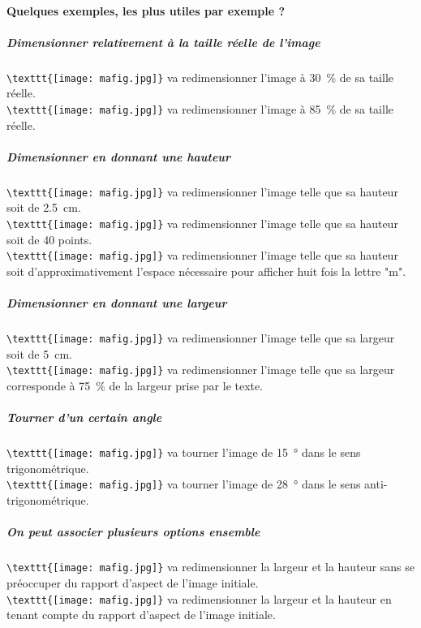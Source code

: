 \documentclass[a4paper, 13pt]{report} %
\begin{document}
		\paragraph{Quelques exemples, les plus utiles par exemple ?}
			\subparagraph{Dimensionner relativement à la taille réelle de l'image\\}
				\verb|\texttt{[image: mafig.jpg]}| va redimensionner l'image à \SI{30}{\percent} de sa taille réelle.\\
				\verb|\texttt{[image: mafig.jpg]}| va redimensionner l'image à \SI{85}{\percent} de sa taille réelle.
			\subparagraph{Dimensionner en donnant une hauteur\\}
				\verb|\texttt{[image: mafig.jpg]}| va redimensionner l'image telle que sa hauteur soit de \SI{2.5}{\centi\meter}.\\
				\verb|\texttt{[image: mafig.jpg]}| va redimensionner l'image telle que sa hauteur soit de 40 points.\\
				\verb|\texttt{[image: mafig.jpg]}| va redimensionner l'image telle que sa hauteur soit d'approximativement l'espace nécessaire pour afficher huit fois la lettre "m".
			\subparagraph{Dimensionner en donnant une largeur\\}
				\verb|\texttt{[image: mafig.jpg]}| va redimensionner l'image telle que sa largeur soit de \SI{5}{\centi\meter}.\\
				\verb|\texttt{[image: mafig.jpg]}| va redimensionner l'image telle que sa largeur corresponde à \SI{75}{\percent} de la largeur prise par le texte.
			\subparagraph{Tourner d'un certain angle\\}
				\verb|\texttt{[image: mafig.jpg]}| va tourner l'image de \SI{15}{\degree} dans le sens trigonométrique.\\
				\verb|\texttt{[image: mafig.jpg]}| va tourner l'image de \SI{28}{\degree} dans le sens anti-trigonométrique.
			\subparagraph{On peut associer plusieurs options ensemble\\}
				\verb|\texttt{[image: mafig.jpg]}| va redimensionner la largeur et la hauteur sans se préoccuper du rapport d'aspect de l'image initiale.\\
				\verb|\texttt{[image: mafig.jpg]}| va redimensionner la largeur et la hauteur en tenant compte du rapport d'aspect de l'image initiale.
\end{document}
